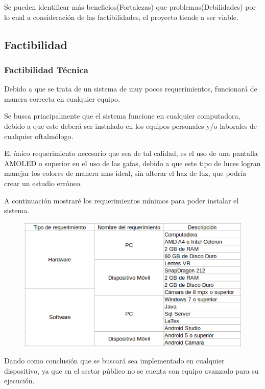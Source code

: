 \documentclass[10pt]{article}
\begin{document}
Se pueden identificar más beneficios(Fortalezas) que problemas(Debilidades) por lo cual a consideración de las factibilidades, el proyecto tiende a ser viable.

\newpage
\subsection{Factibilidad}

\subsubsection{Factibilidad Técnica}

Debido a que se trata de un sistema de muy pocos requerimientos, funcionará de manera correcta en cualquier equipo.

Se busca principalmente que el sistema funcione en cualquier computadora, debido a que este deberá ser instalado en los equipos personales y/o laborales de cualquier oftalmólogo.

El único requerimiento necesario que sea de tal calidad, es el uso de una pantalla AMOLED o superior en el uso de las gafas, debido a que este tipo de luces logran manejar los colores de manera mas ideal, sin alterar el haz de luz, que podría crear un estudio erróneo.

A continuación mostraré los requerimientos mínimos para poder instalar el sistema.


\begin{figure}[H]
	\begin{center}
\includegraphics[scale = 0.80]{Imagenes/tabla.png}
	\end{center} 
\end{figure}

Dando como conclusión que se buscará sea implementado en cualquier dispositivo, ya que en el sector público no se cuenta con equipo avanzado para su ejecución.
\end{document}

